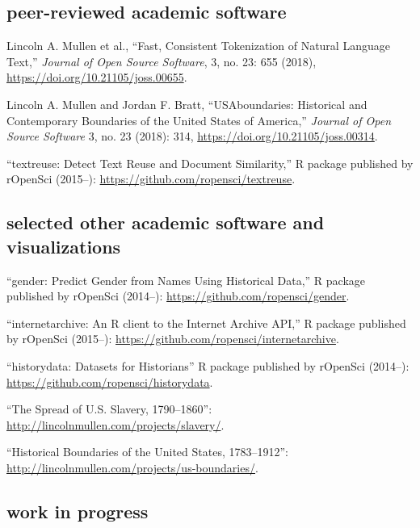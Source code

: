 \documentclass[11pt]{article}
\begin{document}
\subsection{peer-reviewed academic software}\label{academic-software}

Lincoln A. Mullen et al., ``Fast, Consistent Tokenization of Natural Language 
Text,'' \emph{Journal of Open Source Software}, 3, no. 23: 655 (2018), 
\url{https://doi.org/10.21105/joss.00655}.

Lincoln A. Mullen and Jordan F. Bratt, ``USAboundaries: Historical and 
Contemporary Boundaries of the United States of America,'' \emph{Journal of 
Open Source Software} 3, no. 23 (2018): 314, 
\url{https://doi.org/10.21105/joss.00314}.

``textreuse: Detect Text Reuse and Document Similarity,'' R package published 
by rOpenSci (2015--): 
\url{https://github.com/ropensci/textreuse}.

\subsection{selected other academic software and visualizations}\label{other-academic-software}

``gender: Predict Gender from Names Using Historical Data,'' R package 
published by rOpenSci (2014--): \url{https://github.com/ropensci/gender}.

``internetarchive: An R client to the Internet Archive API,'' R package 
published by rOpenSci (2015--): 
\url{https://github.com/ropensci/internetarchive}.

``historydata: Datasets for Historians'' R package published by rOpenSci 
(2014--):  
\url{https://github.com/ropensci/historydata}.


``The Spread of U.S.  Slavery, 1790--1860'':  
\url{http://lincolnmullen.com/projects/slavery/}.

``Historical Boundaries of the United States, 1783--1912'': 
\url{http://lincolnmullen.com/projects/us-boundaries/}.



\subsection{work in progress}\label{in-progress}
\end{document}
